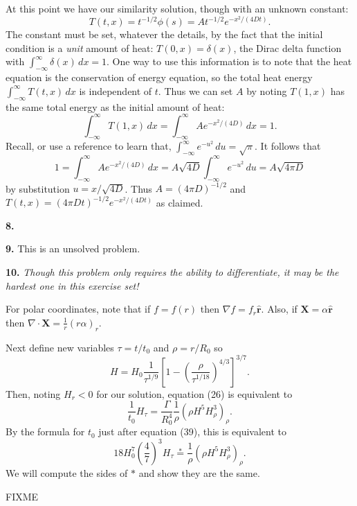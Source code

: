 \documentclass[10pt]{amsart}
\newcommand{\mfile}[1]{
\begin{quote}
\bigskip
\VerbatimInput[frame=single,label=\fbox{\normalsize \textsl{\,#1\,}},fontfamily=courier,fontsize=\footnotesize]{#1}
\end{quote}
}
\newcommand{\Div}{\nabla\cdot}
\newcommand{\grad}{\nabla}
\newcommand{\prob}[1]{\bigskip\noindent\large\textbf{#1.}\normalsize }
\begin{document}
At this point we have our similarity solution, though with an unknown constant:
    $$T(t,x) = t^{-1/2} \phi(s) = A t^{-1/2} e^{- x^2/(4Dt)}.$$
The constant must be set, whatever the details, by the fact that the initial condition is a \emph{unit} amount of heat: $T(0,x) = \delta(x)$, the Dirac delta function with $\int_{-\infty}^\infty \delta(x)\,dx = 1$.  One way to use this information is to note that the heat equation is the conservation of energy equation, so the total heat energy $\int_{-\infty}^\infty T(t,x)\,dx$ is independent of $t$.  Thus we can set $A$ by noting $T(1,x)$ has the same total energy as the initial amount of heat:
    $$\int_{-\infty}^\infty T(1,x)\,dx = \int_{-\infty}^\infty A e^{- x^2/(4D)}\,dx = 1.$$
Recall, or use a reference to learn that, $\int_{-\infty}^\infty e^{- u^2}\,du = \sqrt{\pi}$.  It follows that
    $$1 = \int_{-\infty}^\infty A e^{- x^2/(4D)}\,dx = A \sqrt{4D} \int_{-\infty}^\infty e^{- u^2}\,du = A \sqrt{4\pi D}$$
by substitution $u=x/\sqrt{4D}$.  Thus $A = (4\pi D)^{-1/2}$ and $T(t,x) = (4\pi D t)^{-1/2} e^{- x^2/(4Dt)}$ as claimed.

\prob{8}

\mfile{verifyheat.m}

\prob{9}  This is an unsolved problem.

\prob{10}  \emph{Though this problem only requires the ability to differentiate, it may be the hardest one in this exercise set!}

For polar coordinates, note that if $f=f(r)$ then $\grad f = f_r \hat{\mathbf{r}}$.  Also, if $\mathbf{X}=\alpha \hat{\mathbf{r}}$ then $\Div \mathbf{X} = \frac{1}{r} \left(r \alpha\right)_r$.

Next define new variables $\tau = t/t_0$ and $\rho = r/R_0$ so
    $$H = H_0 \frac{1}{\tau^{1/9}} \left[1 - \left( \frac{\rho}{\tau^{1/18}} \right)^{4/3}\right]^{3/7}.$$
Then, noting $H_r < 0$ for our solution, equation (26) is equivalent to
    $$\frac{1}{t_0} H_\tau = \frac{\Gamma}{R_0^4} \frac{1}{\rho} \left(\rho H^5 H_\rho^3\right)_\rho.$$
By the formula for $t_0$ just after equation (39), this is equivalent to
    $$18 H_0^7 \left(\frac{4}{7}\right)^3 H_\tau \stackrel{\ast}{=} \frac{1}{\rho} \left(\rho H^5 H_\rho^3\right)_\rho.$$
We will compute the sides of $\ast$ and show they are the same.

FIXME
\end{document}
